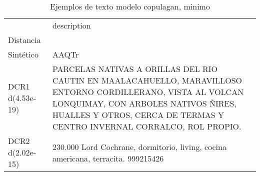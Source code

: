 \begin{table}[H]
\centering
\fontsize{10}{14}\selectfont
\caption{Ejemplos de texto modelo copulagan, minimo}
\label{table-example-economicos-b-2-copulagan-min-text}
\begin{tabular}{|l|m{35em}|}
\hline
\rowcolor[gray]{0.8}
 & description \\
Distancia &  \\
\hline Sintético & AAQTr \\
\hline DCR1 d(4.53e-19) & PARCELAS NATIVAS A ORILLAS DEL RIO CAUTIN EN MAALACAHUELLO, MARAVILLOSO ENTORNO CORDILLERANO, VISTA AL VOLCAN LONQUIMAY, CON ARBOLES NATIVOS \~NIRES, HUALLES Y OTROS, CERCA DE TERMAS Y CENTRO INVERNAL CORRALCO, ROL PROPIO. \\
\hline DCR2 d(2.02e-15) & 230.000 Lord Cochrane, dormitorio, living, cocina americana, terracita. 999215426 \\
\hline
\end{tabular}
\end{table}
